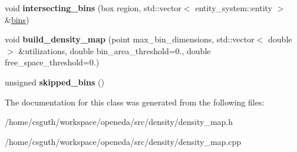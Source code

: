 \begin{DoxyCompactItemize}
\item 
\hypertarget{classophidian_1_1density_1_1density__map_ab980e1156a292ac1eab7e440a30078a7}{void {\bfseries intersecting\-\_\-bins} (box region, std\-::vector$<$ entity\-\_\-system\-::entity $>$ \&\hyperlink{classophidian_1_1density_1_1bins}{bins})}\label{classophidian_1_1density_1_1density__map_ab980e1156a292ac1eab7e440a30078a7}

\item 
\hypertarget{classophidian_1_1density_1_1density__map_a1ec98c245b6a6f35243e1ee38bb0fe5d}{void {\bfseries build\-\_\-density\-\_\-map} (point max\-\_\-bin\-\_\-dimensions, std\-::vector$<$ double $>$ \&utilizations, double bin\-\_\-area\-\_\-threshold=0., double free\-\_\-space\-\_\-threshold=0.)}\label{classophidian_1_1density_1_1density__map_a1ec98c245b6a6f35243e1ee38bb0fe5d}

\item 
\hypertarget{classophidian_1_1density_1_1density__map_a9a0e252313b11cda2e94c608cb48382f}{unsigned {\bfseries skipped\-\_\-bins} ()}\label{classophidian_1_1density_1_1density__map_a9a0e252313b11cda2e94c608cb48382f}

\end{DoxyCompactItemize}


The documentation for this class was generated from the following files\-:\begin{DoxyCompactItemize}
\item 
/home/csguth/workspace/openeda/src/density/density\-\_\-map.\-h\item 
/home/csguth/workspace/openeda/src/density/density\-\_\-map.\-cpp\end{DoxyCompactItemize}
